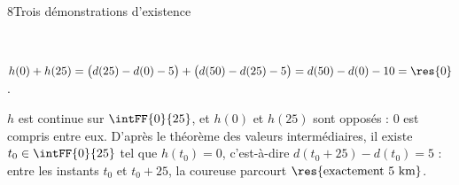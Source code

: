 \begin{corrige}{8}{Trois démonstrations d'existence}
\begin{minipage}[t]{0.4\linewidth}
\\[0.5mm]
\end{minipage}
\begin{questions}[start=4]
  \item $h(0)+h(25)=\big(d(25)-d(0)-5\big)+\big(d(50)-d(25)-5\big)=d(50)-d(0)-10=\res{0}$.
  \item $h$ est continue sur $\intFF{0}{25}$, et $h(0)$ et $h(25)$ sont opposés : $0$ est compris entre eux. D'après le théorème
    des valeurs intermédiaires, il existe $t_0\in\intFF{0}{25}$ tel que $h(t_0)=0$, c'est-à-dire $d(t_0+25)-d(t_0)=5$ : entre les
    instants $t_0$ et $t_0+25$, la coureuse parcourt $\res{\text{exactement }5\text{ km}}$.
\end{questions}
\end{corrige}
